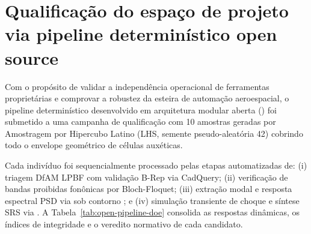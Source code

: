 \section{Qualificação do espaço de projeto via pipeline determinístico open source}
\label{sec:open-pipeline-resultados}

Com o propósito de validar a independência operacional de ferramentas proprietárias e comprovar a robustez da esteira de automação aeroespacial, o pipeline determinístico desenvolvido em arquitetura modular aberta () foi submetido a uma campanha de qualificação com 10 amostras geradas por Amostragem por Hipercubo Latino (LHS, semente pseudo-aleatória 42) cobrindo todo o envelope geométrico de células auxéticas.

Cada indivíduo foi sequencialmente processado pelas etapas automatizadas de: (i) triagem DfAM LPBF com validação B-Rep via CadQuery; (ii) verificação de bandas proibidas fonônicas por Bloch-Floquet; (iii) extração modal e resposta espectral PSD via  sob contorno ; e (iv) simulação transiente de choque e síntese SRS via . A Tabela~\ref{tab:open-pipeline-doe} consolida as respostas dinâmicas, os índices de integridade e o veredito normativo de cada candidato.

